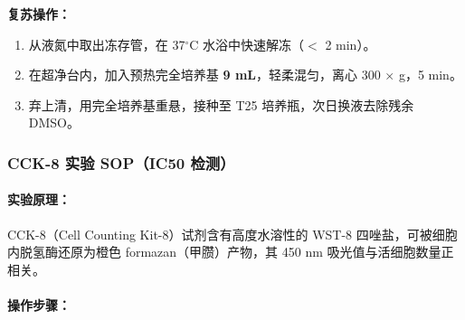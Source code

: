 \documentclass[12pt,a4paper,twoside]{article}
\begin{document}
\textbf{复苏操作：}
\begin{enumerate}
  \item 从液氮中取出冻存管，在 37$^{\circ}$C 水浴中快速解冻（$<$ 2 min）。
  \item 在超净台内，加入预热完全培养基 \textbf{9 mL}，轻柔混匀，离心 300 $\times$ g，5 min。
  \item 弃上清，用完全培养基重悬，接种至 T25 培养瓶，次日换液去除残余 DMSO。
\end{enumerate}

\subsubsection{CCK-8 实验 SOP（IC50 检测）}

\paragraph{实验原理：}CCK-8（Cell Counting Kit-8）试剂含有高度水溶性的 WST-8 四唑盐，可被细胞内脱氢酶还原为橙色 formazan（甲臜）产物，其 450 nm 吸光值与活细胞数量正相关。

\paragraph{操作步骤：}
\end{document}
